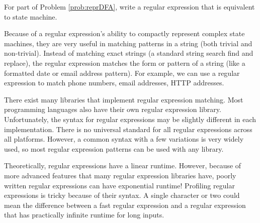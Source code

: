 \begin{problem}
For part of Problem \ref{prob:reprDFA}, write a  regular expression that is equivalent to state machine.
\end{problem}

Because of a regular expression's ability to compactly represent complex state machines, 
they are very useful in matching patterns in a string (both trivial and non-trivial).
Instead of matching exact strings (a standard string search find and replace), the regular expression matches the form or pattern of a string (like a formatted date or email address pattern).
For example, we can use a regular expression to match phone numbers, email addresses, HTTP addresses.

There exist many libraries that implement regular expression matching.
Most programming languages also have their own regular expression library.
Unfortunately, the syntax for regular expressions may be slightly different in each implementation. 
There is no universal standard for all regular expressions across all platforms. 
However, a common syntax with a few variations is very widely used, so most regular expression patterns can be used with any library.

\begin{warn}
Theoretically, regular expressions have a linear runtime.  However, because of more advanced features that many regular expression libraries have, poorly written regular expressions can have exponential runtime!  Profiling regular expressions is tricky because of their syntax.  A single character or two  could mean the difference between a fast regular expression and a regular expression that has practically infinite runtime for long inputs.
\end{warn}

